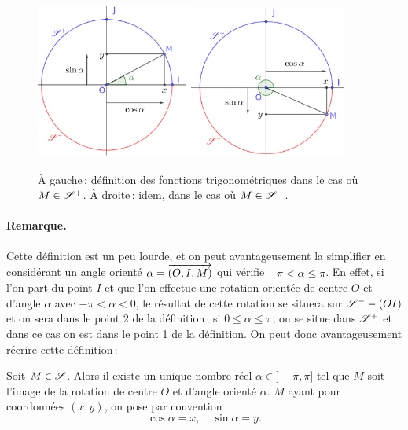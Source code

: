 		\begin{figure}
			\includegraphics[width=0.46\textwidth]{image/fct_trigo/def_trigo_sp.png}\includegraphics[width=0.46\textwidth]{image/fct_trigo/def_trigo_sm.png}
			\caption{À gauche\,: définition des fonctions trigonométriques dans le cas où $M\in\S^+$. À droite\,: idem, dans le cas où $M\in\S^-$.}
			\label{fig_def_trigo_Spm}
		\end{figure}

		\paragraph{Remarque.} Cette définition est un peu lourde, et on peut avantageusement la simplifier en considérant un angle orienté $\alpha=\ovr{(O,I,M)}$ qui vérifie $-\pi<\alpha\le \pi$. En effet, si l'on part du point $I$ et que l'on effectue une rotation orientée de centre $O$ et d'angle $\alpha$ avec $-\pi<\alpha<0$, le résultat de cette rotation se situera sur $\S^--(OI)$ et on sera dans le point 2 de la définition\,; si $0\le\alpha\le\pi$, on se situe dans $\S^+$ et dans ce cas on est dans le point 1 de la définition. On peut donc avantageusement récrire cette définition\,:

		\begin{defi}
			Soit $M\in\S$. Alors il existe un unique nombre réel $\alpha\in]-\pi,\pi]$ tel que $M$ soit l'image de la rotation de centre $O$ et d'angle orienté $\alpha$. $M$ ayant pour coordonnées $(x,y)$, on pose par convention
			\begin{equation}
				\cos\alpha = x,\quad \sin\alpha = y.
			\end{equation}
		\end{defi}

